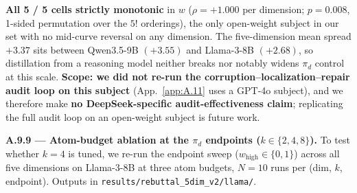 \begin{table}[t]
\centering
{}
\caption{$\pi_d$ sweep on DeepSeek-R1-Distill-Qwen-14B Q4 served via Ollama on a single 3090, $N=10$ runs per cell. All 5 / 5 cells strictly monotonic; five-dimension mean traverses $1.41 \to 4.78$ (spread $+3.37$), between Qwen3.5-9B ($+3.55$) and Llama-3-8B ($+2.68$).}
\label{tab:pi-deepseek}
\end{table}

\textbf{All 5 / 5 cells strictly monotonic} in $w$ ($\rho = +1.000$ per dimension; $p = 0.008$, 1-sided permutation over the $5!$ orderings), the only open-weight subject in our set with no mid-curve reversal on any dimension. The five-dimension mean spread $+3.37$ sits between Qwen3.5-9B $(+3.55)$ and Llama-3-8B $(+2.68)$, so distillation from a reasoning model neither breaks nor notably widens $\pi_d$ control at this scale. \textbf{Scope: we did not re-run the corruption--localization--repair audit loop on this subject} (App.~\ref{app:A.11} uses a GPT-4o subject), and we therefore make \textbf{no DeepSeek-specific audit-effectiveness claim}; replicating the full audit loop on an open-weight subject is future work.

\label{app:A.9.9}
\textbf{A.9.9 --- Atom-budget ablation at the $\pi_d$ endpoints ($k \in \{2, 4, 8\}$).} To test whether $k = 4$ is tuned, we re-run the endpoint sweep ($w_\text{high} \in \{0, 1\}$) across all five dimensions on Llama-3-8B at three atom budgets, $N=10$ runs per (dim, $k$, endpoint). Outputs in \texttt{results/\allowbreak{}rebuttal\_\allowbreak{}5dim\_\allowbreak{}v2/\allowbreak{}llama/\allowbreak{}}.

